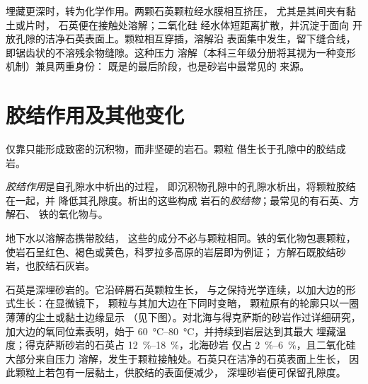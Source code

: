 埋藏更深时，转为化学作用。两颗石英颗粒经水膜相互挤压，
尤其是其间夹有黏土或片时，
石英便在接触处溶解；二氧化硅
经水体短距离扩散，并沉淀于面向
开放孔隙的洁净石英表面上。颗粒相互穿插，溶解沿
表面集中发生，留下缝合线，即锯齿状的不溶残余物缝隙。这种压力
溶解（本科三年级分册将其视为一种变形机制）兼具两重身份：
既是的最后阶段，也是砂岩中最常见的
来源。

\section{胶结作用及其他变化}\label{sec:b1:diagenesis-basins:cementation}

仅靠只能形成致密的沉积物，而非坚硬的岩石。颗粒
借生长于孔隙中的胶结成岩。

\begin{definition}\label{def:b1:diagenesis-basins:cement}
\emph{胶结作用}是自孔隙水中析出的过程，
即沉积物孔隙中的孔隙水析出，将颗粒胶结在一起，并
降低其孔隙度。析出的这些构成
岩石的\emph{胶结物}；最常见的有石英、方解石、
铁的氧化物与。
\end{definition}

地下水以溶解态携带胶结，
这些的成分不必与颗粒相同。铁的氧化物包裹颗粒，
使岩石呈红色、褐色或黄色，科罗拉多高原的岩层即为例证；
方解石既胶结砂岩，也胶结石灰岩。

石英是深埋砂岩的。它沿碎屑石英颗粒生长，
与之保持光学连续，以加大边的形式生长：在显微镜下，
颗粒与其加大边在下同时变暗，
颗粒原有的轮廓只以一圈薄薄的尘土或黏土边缘显示
（见下图）。对北海与得克萨斯的砂岩作过详细研究，
加大边的氧同位素表明，始于
\qtyrange{60}{80}{\celsius}，并持续到岩层达到其最大
埋藏温度；得克萨斯砂岩的石英占 \qtyrange{12}{18}{\percent}，北海砂岩
仅占 \qtyrange{2}{6}{\percent}，且二氧化硅大部分来自压力
溶解，发生于颗粒接触处。石英只在洁净的石英表面上生长，
因此颗粒上若包有一层黏土，供胶结的表面便减少，
深埋砂岩便可保留孔隙度。

